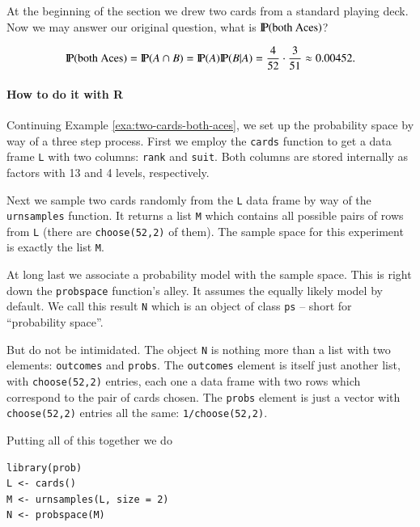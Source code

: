 \documentclass[captions=tableheading]{scrbook}
\begin{document}
\begin{example}
\label{exa:two-cards-both-aces}
At the beginning of the section we drew two cards from a standard playing deck. Now we may answer our original question, what is \(\P(\mbox{both Aces})\)?

\[
\P(\mbox{both Aces})=\P(A\cap B)=\P(A)\P(B|A)=\frac{4}{52}\cdot\frac{3}{51}\approx0.00452.
\]

\end{example}

\paragraph*{How to do it with \textsf{R}}
\label{sub:howto-ps-objects}

Continuing Example \ref{exa:two-cards-both-aces}, we set up the probability space by way of a three step process. First we employ the \texttt{cards} function to get a data frame \texttt{L} with two columns: \texttt{rank} and \texttt{suit}. Both columns are stored internally as factors with 13 and 4 levels, respectively.

Next we sample two cards randomly from the \texttt{L} data frame by way of the \texttt{urnsamples} function. It returns a list \texttt{M} which contains all possible pairs of rows from \texttt{L} (there are \texttt{choose(52,2)} of them). The sample space for this experiment is exactly the list \texttt{M}.

At long last we associate a probability model with the sample space. This is right down the \texttt{probspace} function's alley. It assumes the equally likely model by default. We call this result \texttt{N} which is an object of class \texttt{ps} -- short for ``probability space''.

But do not be intimidated. The object \texttt{N} is nothing more than a list with two elements: \texttt{outcomes} and \texttt{probs}. The \texttt{outcomes} element is itself just another list, with \texttt{choose(52,2)} entries, each one a data frame with two rows which correspond to the pair of cards chosen. The \texttt{probs} element is just a vector with \texttt{choose(52,2)} entries all the same: \texttt{1/choose(52,2)}.

Putting all of this together we do 


\begin{verbatim}
library(prob)
L <- cards()
M <- urnsamples(L, size = 2)
N <- probspace(M)
\end{verbatim}
\end{document}
